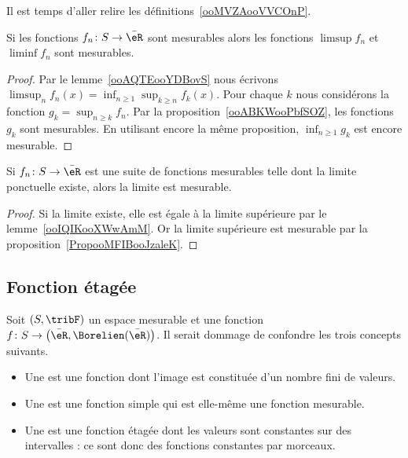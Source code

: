 Il est temps d'aller relire les définitions~\ref{ooMVZAooVVCOnP}.

\begin{proposition}     \label{PropooMFIBooJzaleK}
    Si les fonctions \( f_n\colon S\to \bar \eR\) sont mesurables alors les fonctions \( \limsup f_n\) et \( \liminf f_n\) sont mesurables.
\end{proposition}

\begin{proof}
    Par le lemme~\ref{ooAQTEooYDBovS} nous écrivons \( \limsup_nf_n(x)=\inf_{n\geq 1}\sup_{k\geq n} f_k(x)\). Pour chaque \( k\) nous considérons la fonction \( g_k=\sup_{n\geq k}f_n\). Par la proposition~\ref{ooABKWooPbfSOZ}, les fonctions \( g_k\) sont mesurables. En utilisant encore la même proposition, \( \inf_{n\geq 1}g_k\) est encore mesurable.
\end{proof}

\begin{proposition}      \label{PropooDXBGooSFqrai}
    Si \( f_n\colon S\to \bar \eR\) est une suite de fonctions mesurables telle dont la limite ponctuelle existe, alors la limite est mesurable.
\end{proposition}

\begin{proof}
    Si la limite existe, elle est égale à la limite supérieure par le lemme~\ref{ooIQIKooXWwAmM}. Or la limite supérieure est mesurable par la proposition~\ref{PropooMFIBooJzaleK}.
\end{proof}

\subsection{Fonction étagée}

\begin{definition}\label{DefBPCxdel}
    Soit \( (S,\tribF)\) un espace mesurable et une fonction \( f\colon S\to \big( \bar\eR,\Borelien(\bar\eR) \big)\). Il serait dommage de confondre les trois concepts suivants.
    \begin{itemize}
        \item
    Une  est une fonction dont l'image est constituée d'un nombre fini de valeurs.
\item
    Une  est une fonction simple qui est elle-même une fonction mesurable.
\item
    Une  est une fonction étagée dont les valeurs sont constantes sur des intervalles : ce sont donc des fonctions constantes par morceaux.
    \end{itemize}
\end{definition}

